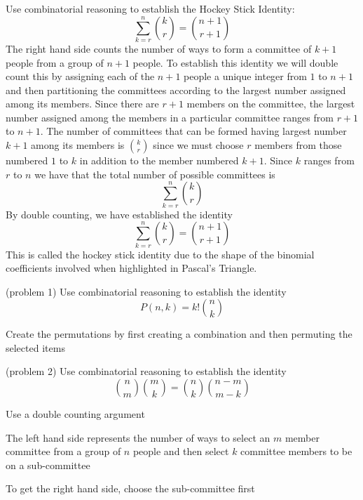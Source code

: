 \documentclass[handout]{ximera}
\begin{document}
\begin{example}[example 5]
Use combinatorial reasoning to establish the Hockey Stick Identity:
\[
\sum_{k=r}^{n}\binom{k}{r}=\binom{n+1}{r+1} %
\]
The right hand side counts the number of ways to form a committee of $k+1$ people from a group of $n+1$ people.
To establish this identity we will double count this by assigning each of the $n+1$ people a unique 
integer from $1$ to $n+1$ and then partitioning the committees according to the largest number 
assigned among its members.
Since there are $r+1$ members on the committee, the largest number assigned among the 
members in a particular committee ranges from $r+1$ to $n+1$.
The number of committees that can be formed having largest number $k+1$ among its members
is $\binom{k}{r}$ since we must choose
$r$  members from those numbered $1$ to $k$ in addition to the member numbered $k+1$. 
Since $k$ ranges 
from $r$ to $n$ we have that the total number of possible committees is
\[
\sum_{k=r}^{n}\binom{k}{r}
\]
By double counting, we have established the identity
\[
\sum_{k=r}^{n}\binom{k}{r}=\binom{n+1}{r+1}
\]
This is called the hockey stick identity due to the shape of the binomial 
coefficients involved when highlighted in Pascal's Triangle.
\end{example}


\begin{problem}(problem 1)
Use combinatorial reasoning to establish the identity
\[
P(n,k) = k!\binom{n}{k}
\]
\begin{hint}
Create the permutations by first creating a combination and then permuting the selected items
\end{hint}
\end{problem}

\begin{problem}(problem 2)
Use combinatorial reasoning to establish the identity
\[
\binom{n}{m} \binom{m}{k} = \binom{n}{k} \binom{n-m}{m-k}
\]
\begin{hint}
Use a double counting argument
\end{hint}
\begin{hint}
The left hand side represents the number of ways to select an $m$ member committee from a group of $n$ people and then 
select $k$ committee members to be on a sub-committee
\end{hint}

\begin{hint}
To get the right hand side, choose the sub-committee first
\end{hint}
\end{problem}
\end{document}
